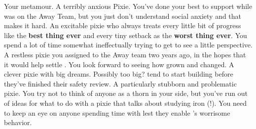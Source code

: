 \documentclass[char]{PP}
\begin{document}
\begin{contacts}
	\contact{\cFButterfly{}} Your metamour. A terribly anxious Pixie. You’ve done your best to support \cFButterfly{\them} while \cFLost{} was on the Away Team, but you just don’t understand \cFButterfly{\their} social anxiety and that makes it hard.
	\contact{\cMTree{}} An excitable pixie who always treats every little bit of progress like the \textbf{best thing ever} and every tiny setback as the \textbf{worst thing ever}. You spend a lot of time somewhat ineffectually trying to get \cMTree{\them} to see a little perspective.
	\contact{\cMChange{}} A restless pixie you assigned to the Away team two years ago, in the hopes that it would help settle \cMChange{\them}. You look forward to seeing how  \cMChange{\have} grown and changed.
	\contact{\cMAirship{}} A clever pixie with big dreams. Possibly too big? \cMAirship{\They} tend to start building before they’ve finished their safety review.
	\contact{\cMIron{}} A particularly stubborn and problematic pixie. You try not to think of anyone as a thorn in your side, but you’ve run out of ideas for what to do with a pixie that talks about studying iron (!). You need to keep an eye on anyone spending time with \cMIron{} lest they enable \cMIron{}’s worrisome behavior.
\end{contacts}
\end{document}
